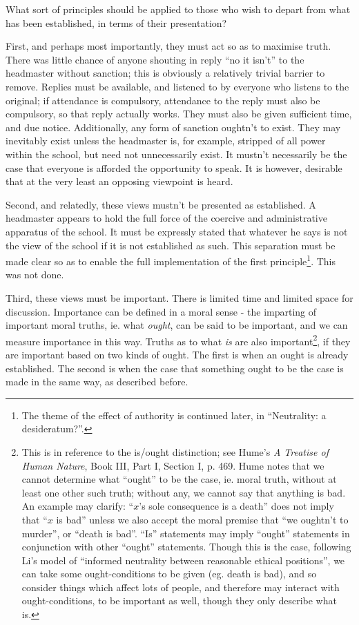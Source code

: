 \documentclass[12pt,a4paper]{report}
\begin{document}
\begin{multicols}{2}
\begin{multicols}{2}
What sort of principles should be applied to those who wish to depart
from what has been established, in terms of their presentation?

First, and perhaps most importantly, they must act so as to maximise
truth. There was little chance of anyone shouting in reply ``no it
isn't'' to the headmaster without sanction; this is obviously a
relatively trivial barrier to remove. Replies must be available, and
listened to by everyone who listens to the original; if attendance is
compulsory, attendance to the reply must also be compulsory, so that
reply actually works. They must also be given sufficient time, and due
notice. Additionally, any form of sanction oughtn't to exist. They may
inevitably exist unless the headmaster is, for example, stripped of all
power within the school, but need not unnecessarily exist. It mustn't
necessarily be the case that everyone is afforded the opportunity to
speak. It is however, desirable that at the very least an opposing
viewpoint is heard.

Second, and relatedly, these views mustn't be presented as established.
A headmaster appears to hold the full force of the coercive and
administrative apparatus of the school. It must be expressly stated that
whatever he says is not the view of the school if it is not established
as such. This separation must be made clear so as to enable the full
implementation of the first principle\footnote{The theme of the effect
	of authority is continued later, in ``Neutrality: a desideratum?''.}.
This was not done.

Third, these views must be important. There is limited time and limited
space for discussion. Importance can be defined in a moral sense - the
imparting of important moral truths, ie. what \textit{ought}, can be said
to be important, and we can measure importance in this way. Truths as to
what \textit{is} are also important\footnote{This is in reference to the
	is/ought distinction; see Hume's \textit{A Treatise of Human Nature},
	Book III, Part I, Section I, p. 469. Hume notes that we cannot
	determine what ``ought'' to be the case, ie. moral truth, without at
	least one other such truth; without any, we cannot say that anything
	is bad. An example may clarify: ``$x$'s sole consequence is a
	death'' does not imply that ``$x$ is bad'' unless we also accept
	the moral premise that ``we oughtn't to murder'', or ``death is bad''.
	``Is'' statements may imply ``ought'' statements in conjunction with
	other ``ought'' statements. Though this is the case, following Li's
	model of ``informed neutrality between reasonable ethical positions'',
	we can take some ought-conditions to be given (eg. death is bad), and
	so consider things which affect lots of people, and therefore may
	interact with ought-conditions, to be important as well, though they
	only describe what is.}, if they are important based on two kinds of
ought. The first is when an ought is already established. The second is
when the case that something ought to be the case is made in the same
way, as described before.


\end{multicols}
\end{multicols}
\end{document}

